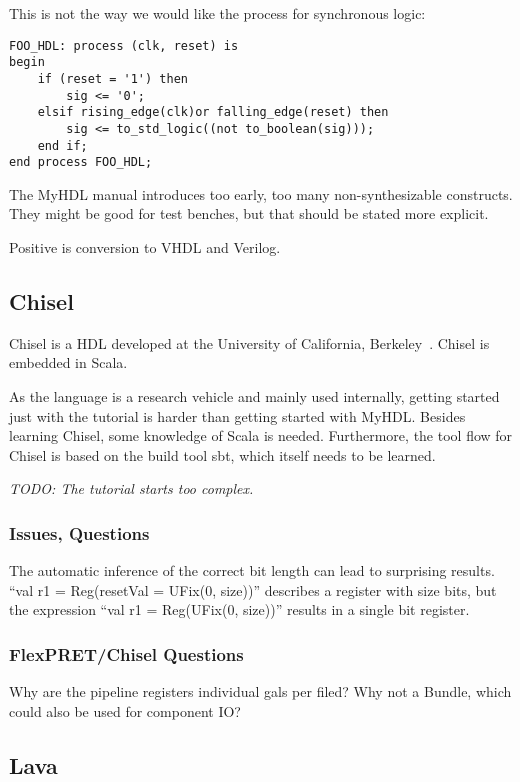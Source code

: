 \documentclass[10pt, conference, compsocconf]{IEEEtran}
\newcommand{\todo}[1]{{\emph{TODO: #1}}}
\begin{document}
This is not the way we would like the process for synchronous logic:

\begin{verbatim}
FOO_HDL: process (clk, reset) is
begin
    if (reset = '1') then
        sig <= '0';
    elsif rising_edge(clk)or falling_edge(reset) then
        sig <= to_std_logic((not to_boolean(sig)));
    end if;
end process FOO_HDL;
\end{verbatim}

The MyHDL manual introduces too early, too many non-synthesizable constructs.
They might be good for test benches, but that should be stated more explicit.

Positive is conversion to VHDL and Verilog.

\subsection{Chisel}

Chisel is a HDL developed at the University of California, Berkeley~\cite{chisel:dac2012}.
Chisel is embedded in Scala.

As the language is a research vehicle and mainly used internally, getting
started just with the tutorial is harder than getting started with MyHDL.
Besides learning Chisel, some knowledge of Scala is needed. Furthermore,
the tool flow for Chisel is based on the build tool sbt, which itself needs to
be learned.

\todo{The tutorial starts too complex.}

\subsubsection{Issues, Questions}

The automatic inference of the correct bit length can lead to surprising
results. ``val r1 = Reg(resetVal = UFix(0, size))'' describes a register with
size bits, but the expression ``val r1 = Reg(UFix(0, size))'' results in a single
bit register.

\subsubsection{FlexPRET/Chisel Questions}

Why are the pipeline registers individual gals per filed? Why not a Bundle,
which could also be used for component IO?

\subsection{Lava}
\end{document}
